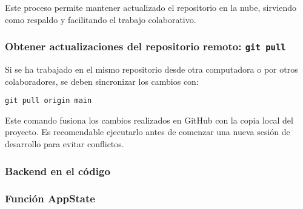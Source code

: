 Este proceso permite mantener actualizado el repositorio en la nube, sirviendo como respaldo y facilitando el trabajo colaborativo.

\subsubsection*{Obtener actualizaciones del repositorio remoto: \texttt{git pull}}

Si se ha trabajado en el mismo repositorio desde otra computadora o por otros colaboradores, se deben sincronizar los cambios con:

\begin{verbatim}
git pull origin main
\end{verbatim}

Este comando fusiona los cambios realizados en GitHub con la copia local del proyecto. Es recomendable ejecutarlo antes de comenzar una nueva sesión de desarrollo para evitar conflictos.









\subsubsection{Backend en el código}

\subsubsection*{Función AppState}

